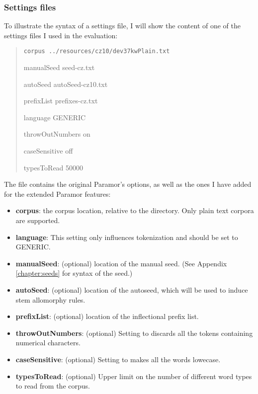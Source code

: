 \subsubsection{Settings files}

To illustrate the syntax of a settings file, I will show the content of one of the settings files I used in the evaluation:

\begin{quote}
\tt corpus ../resources/cz10/dev37kwPlain.txt

manualSeed seed-cz.txt

autoSeed autoSeed-cz10.txt

prefixList prefixes-cz.txt

language GENERIC

throwOutNumbers on

caseSensitive off

typesToRead 50000
\end{quote}
The file contains the original Paramor's options, as well as the ones I have added for the extended Paramor features: \begin{itemize}
\item \textbf{corpus}: the corpus location, relative to the  directory. Only plain text corpora are supported.

\item \textbf{language}: This setting only influences tokenization and should be set to GE\-NE\-RIC.

\item \textbf{manualSeed}: (optional) location of the manual seed. (See Appendix \ref{chapter:seeds} for syntax of the seed.)

\item \textbf{autoSeed}: (optional) location of the autoseed, which will be used to induce stem allomorphy rules.

\item \textbf{prefixList}: (optional) location of the inflectional prefix list.

\item \textbf{throwOutNumbers}: (optional) Setting to  discards all the tokens containing numerical characters.

\item \textbf{caseSensitive}: (optional) Setting to  makes all the words lowecase.

\item \textbf{typesToRead}: (optional) Upper limit on the number of different word types to read from the corpus.
\end{itemize}

